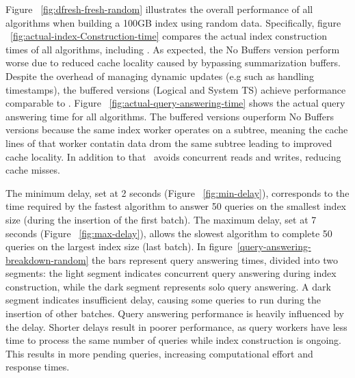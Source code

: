 Figure ~\ref{fig:dfresh-fresh-random} illustrates the overall performance of all 
algorithms when building a 100GB index using random data. Specifically,
figure ~\ref{fig:actual-index-Construction-time} compares the actual index construction times 
of all algorithms, including \Fresh. As expected, the No Buffers version 
perform worse due to reduced cache locality caused by bypassing summarization buffers.
Despite the overhead of managing dynamic updates (e.g such as handling timestamps), 
the buffered versions (Logical and System TS) achieve performance comparable to \Fresh. 
Figure ~\ref{fig:actual-query-answering-time} shows the 
actual query answering time for all algorithms. The buffered versions ouperform No Buffers versions 
because the same index worker operates on a subtree, meaning the cache lines of that worker 
contatin data drom the same subtree leading to improved cache locality. In addition to that
\Fresh\ avoids concurrent reads and writes, reducing cache misses.



The minimum delay, set at 2 seconds (Figure ~\ref{fig:min-delay}), corresponds to the 
time required by the fastest algorithm to answer 50 queries on the smallest index size 
(during the insertion of the first batch). The maximum delay, set at 7 seconds
(Figure ~\ref{fig:max-delay}), allows the slowest algorithm to complete 50 queries on the
largest index size (last batch). In figure~\ref{query-answering-breakdown-random} the bars represent query answering times,
divided into two segments: the light segment indicates concurrent query answering
during index construction, while the dark segment represents solo query answering.
A dark segment indicates insufficient delay, causing some queries to run during
the insertion of other batches.
%
Query answering performance is heavily influenced by the delay. Shorter delays result
in poorer performance, as query workers have less time to process the same number
of queries while index construction is ongoing. This results in more pending queries,
increasing computational effort and response times.




